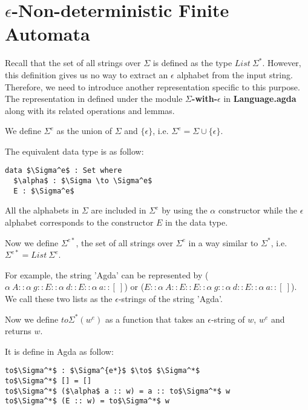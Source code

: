 \section{\(\epsilon\)-Non-deterministic Finite Automata}
\par Recall that the set of all strings over \(\Sigma\) is defined as
the type \(List\ \Sigma^*\). However, this definition gives us no way to
extract an \(\epsilon\) alphabet from the input string. Therefore,
we need to introduce another representation specific to this
purpose. The representation in defined under the module
\textbf{\(\Sigma\)-with-\(\epsilon\)} in \textbf{Language.agda} along
with its related operations and lemmas. 

\begin{defn}
\noindent We define \(\Sigma^e\) as the union of
\(\Sigma\) and \(\{\epsilon\}\), i.e. \(\Sigma^e = \Sigma \cup \{\epsilon\}\).
\end{defn} 

\par The equivalent data type is as follow:
\begin{lstlisting}[mathescape=true,xleftmargin=.3\textwidth]
data $\Sigma^e$ : Set where
  $\alpha$ : $\Sigma \to \Sigma^e$
  E : $\Sigma^e$
\end{lstlisting}

\par All the alphabets in \(\Sigma\) are included in \(\Sigma^e\) by using the
\(\alpha\) constructor while the \(\epsilon\) alphabet corresponds to
the constructor \(E\) in the data type. 

\begin{defn}
\noindent Now we define \(\Sigma^{e*}\), the set of all strings over
\(\Sigma^e\) in a way similar to \(\Sigma^*\), i.e. \(\Sigma^{e*} =
List\ \Sigma^e\). 
\end{defn}

\par For example, the string 'Agda' can be
represented by (\(\alpha\ A :: \alpha\ g :: E :: \alpha\ d :: E :: \alpha\
a :: [\ ]\)) or (\(E :: \alpha\ A :: E :: E :: \alpha\ g :: \alpha\ d ::
E :: \alpha\ a :: [\ ]\)). We call these two lists as the \(\epsilon\)-strings of the
string 'Agda'. 

\begin{defn}
\noindent Now we define \(to\Sigma^*(w^e)\) as a function that takes an
\(\epsilon\)-string of \(w\), \(w^e\) and returns \(w\). 
\end{defn}

\par It is define in Agda as follow: 
\begin{lstlisting}[mathescape=true,xleftmargin=.3\textwidth]
to$\Sigma^*$ : $\Sigma^{e*}$ $\to$ $\Sigma^*$
to$\Sigma^*$ [] = []
to$\Sigma^*$ ($\alpha$ a :: w) = a :: to$\Sigma^*$ w
to$\Sigma^*$ (E :: w) = to$\Sigma^*$ w
\end{lstlisting}

